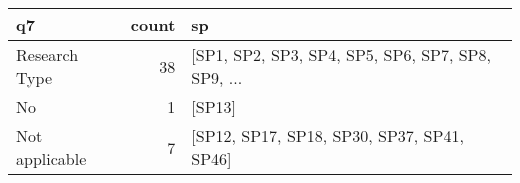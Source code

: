 \begin{tabular}{lrl}
\toprule
             q7 &  count &                                                 sp \\
\midrule
  Research Type &     38 &  [SP1, SP2, SP3, SP4, SP5, SP6, SP7, SP8, SP9, ... \\
             No &      1 &                                             [SP13] \\
 Not applicable &      7 &         [SP12, SP17, SP18, SP30, SP37, SP41, SP46] \\
\bottomrule
\end{tabular}
